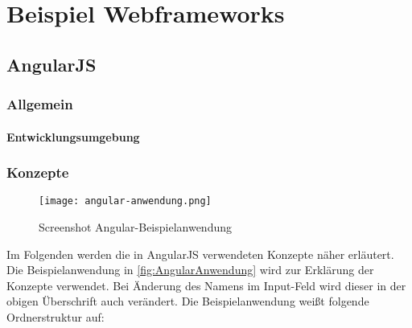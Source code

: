 
\chapter{Beispiel Webframeworks}

\section{AngularJS}

\subsection{Allgemein}

\subsubsection{}


\subsubsection{Entwicklungsumgebung}


\subsection{Konzepte}

\begin{figure}
	\centering
	\label{fig:AngularAnwendung}
	\texttt{[image: angular-anwendung.png]}
	\caption[Screenshot Angular-Beispielanwendung]{Screenshot Angular-Beispielanwendung} 
\end{figure}


Im Folgenden werden die in AngularJS verwendeten Konzepte näher erläutert. Die Beispielanwendung in \autoref{fig:AngularAnwendung} wird zur Erklärung der Konzepte verwendet. Bei Änderung des Namens im Input-Feld wird dieser in der obigen Überschrift auch verändert. Die Beispielanwendung weißt folgende Ordnerstruktur auf:

